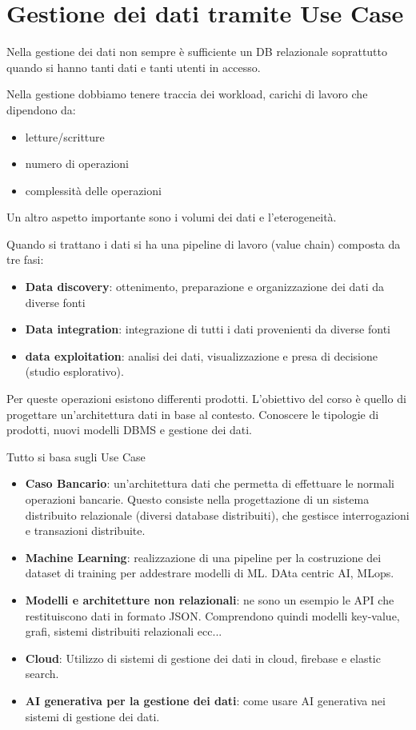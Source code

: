 \section{Gestione dei dati tramite Use Case}
Nella gestione dei dati non sempre è sufficiente un DB relazionale soprattutto
quando si hanno tanti dati e tanti utenti in accesso.

Nella gestione dobbiamo tenere traccia dei workload, carichi di lavoro che dipendono da:
\begin{itemize}
    \item letture/scritture
    \item numero di operazioni
    \item complessità delle operazioni
\end{itemize}
Un altro aspetto importante sono i volumi dei dati e l'eterogeneità.

Quando si trattano i dati si ha una pipeline di lavoro (value chain) composta da
tre fasi:
\begin{itemize}
    \item \textbf{Data discovery}: ottenimento, preparazione e organizzazione
          dei dati da diverse fonti
    \item \textbf{Data integration}: integrazione di tutti i dati provenienti da
          diverse fonti
    \item \textbf{data exploitation}: analisi dei dati, visualizzazione e presa
          di decisione (studio esplorativo).
\end{itemize}
Per queste operazioni esistono differenti prodotti.
L'obiettivo del corso è quello di progettare un'architettura dati in base al contesto.
Conoscere le tipologie di prodotti, nuovi modelli DBMS e gestione dei dati.

Tutto si basa sugli Use Case
\begin{itemize}
    \item \textbf{Caso Bancario}: un'architettura dati che permetta di effettuare 
          le normali operazioni bancarie. Questo consiste nella progettazione di 
          un sistema distribuito relazionale (diversi database distribuiti), che
          gestisce interrogazioni e transazioni distribuite.
    \item \textbf{Machine Learning}: realizzazione di una pipeline per la 
          costruzione dei dataset di training per addestrare modelli di ML. 
          DAta centric AI, MLops.
    \item \textbf{Modelli e architetture non relazionali}: ne sono un esempio le API
          che restituiscono dati in formato JSON. Comprendono quindi modelli key-value,
          grafi, sistemi distribuiti relazionali ecc...
    \item \textbf{Cloud}: Utilizzo di sistemi di gestione dei dati in cloud, firebase e elastic search.
    \item \textbf{AI generativa per la gestione dei dati}: come usare AI generativa nei 
          sistemi di gestione dei dati.
\end{itemize}

